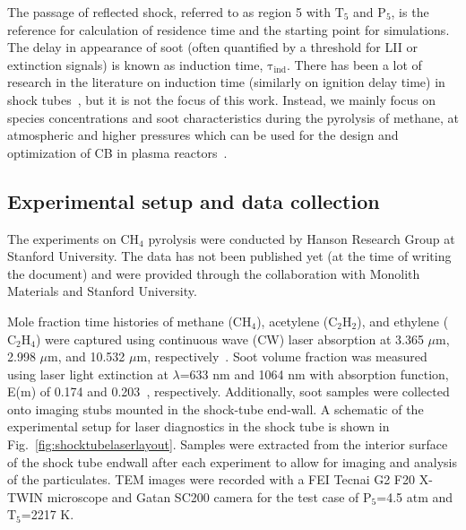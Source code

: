 The passage of reflected shock, referred to as region 5 with $\mathrm{T_5}$ and $\mathrm{P_5}$, is the reference for calculation of residence time and the starting point for simulations. The delay in appearance of soot (often quantified by a threshold for LII or extinction signals) is known as induction time, $\mathrm{\tau_{ind}}$. There has been a lot of research in the literature on induction time (similarly on ignition delay time) in shock tubes~\citep{fussey1978shock}, but it is not the focus of this work. Instead, we mainly focus on species concentrations and soot characteristics during the pyrolysis of methane, at atmospheric and higher pressures which can be used for the design and optimization of CB in plasma reactors~\citep{fulcheri2023energy}. 

%
%

\subsection{Experimental setup and data collection}

The experiments on $\mathrm{CH_4}$ pyrolysis were conducted by Hanson Research Group at Stanford University. The data has not been published yet (at the time of writing the document) and were provided through the collaboration with Monolith Materials and Stanford University.

Mole fraction time histories of methane ($\mathrm{CH_4}$), acetylene ($\mathrm{C_2H_2}$), and ethylene ($\mathrm{C_2H_4}$) were captured using continuous wave (CW) laser absorption at 3.365 $\mu$m, 2.998 $\mu$m, and 10.532 $\mu$m, respectively~\citep{pinkowski2019multi, cassady2020thermal, stranic2014laser}. Soot volume fraction was measured using laser light extinction at $\lambda$=633 nm and 1064 nm with absorption function, E(m) of 0.174 and 0.203~\citep{lee1981optical}, respectively. Additionally, soot samples were collected onto imaging stubs mounted in the shock-tube end-wall. A schematic of the experimental setup for laser diagnostics in the shock tube is shown in Fig.~\ref{fig:shocktubelaserlayout}. Samples were extracted from the interior surface of the shock tube endwall after each experiment to allow for imaging and analysis of the particulates. TEM images were recorded with a FEI Tecnai G2 F20 X-TWIN microscope and Gatan SC200 camera for the test case of $\mathrm{P_5}$=4.5 atm and $\mathrm{T_5}$=2217 K.

